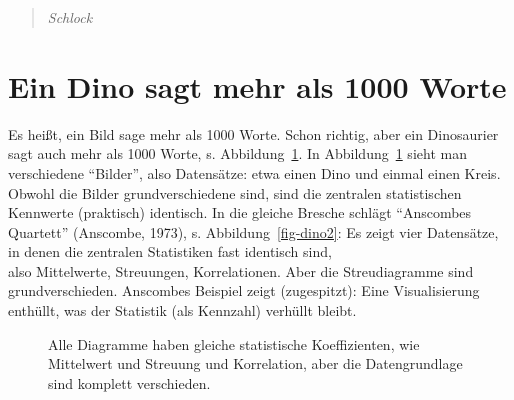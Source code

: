 \documentclass[
  letterpaper,
]{scrbook}
\theoremstyle{definition}
\theoremstyle{definition}
\theoremstyle{definition}
\theoremstyle{remark}
\begin{document}
\begin{quote}
{} \emph{Schlock}
\end{quote}

\section{Ein Dino sagt mehr als 1000
Worte}\label{ein-dino-sagt-mehr-als-1000-worte}

Es heißt, ein Bild sage mehr als 1000 Worte. Schon richtig, aber ein
Dinosaurier sagt auch mehr als 1000 Worte, s. Abbildung~\ref{fig-dino1}.
In Abbildung~\ref{fig-dino1} sieht man verschiedene ``Bilder'', also
Datensätze: etwa einen Dino und einmal einen Kreis. Obwohl die Bilder
grundverschiedene sind, sind die zentralen statistischen Kennwerte
(praktisch) identisch. In die gleiche Bresche schlägt ``Anscombes
Quartett'' (Anscombe, 1973), s. Abbildung~\ref{fig-dino2}: Es zeigt vier
Datensätze, in denen die zentralen Statistiken fast identisch sind,\\
also Mittelwerte, Streuungen, Korrelationen. Aber die Streudiagramme
sind grundverschieden. Anscombes Beispiel zeigt (zugespitzt): Eine
Visualisierung enthüllt, was der Statistik (als Kennzahl) verhüllt
bleibt.

\begin{figure}


\caption{\label{fig-dino1}Alle Diagramme haben gleiche statistische
Koeffizienten, wie Mittelwert und Streuung und Korrelation, aber die
Datengrundlage sind komplett verschieden.}

\end{figure}%
\end{document}

